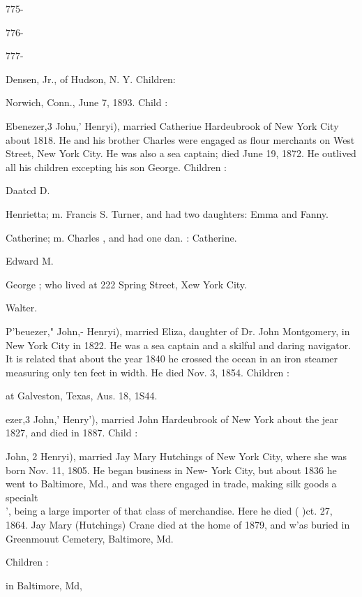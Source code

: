 \documentclass[oneside]{book}
\begin{document}
775- 




776- 




777- 









Densen, Jr., of Hudson, N. Y. Children: 




Norwich, Conn., June 7, 1893. Child : 

Ebenezer,3 Johu,' Henryi), married Catheriue Hardeubrook of 
New York City about 1818. He and his brother Charles were 
engaged as flour merchants on West Street, New York City. He 
was also a sea captain; died June 19, 1872. He outlived all his 
children excepting his son George. Children : 

Daatcd D. 

Henrietta; m. Francis S. Turner, and had two daughters: 
Emma and Fanny. 

Catherine; m. Charles , and had one dan. : Catherine. 

Edward M. 

George ; who lived at 222 Spring Street, Xew York City. 

Walter. 

P'beuezer," John,- Henryi), married Eliza, daughter of Dr. John 
Montgomery, in New York City in 1822. He was a sea captain 
and a skilful and daring navigator. It is related that about the 
year 1840 he crossed the ocean in an iron steamer measuring only 
ten feet in width. He died Nov. 3, 1854. Children : 



at Galveston, Texas, Aus. 18, 1S44. 

ezer,3 John,' Henry'), married John Hardeubrook of New York 
about the jear 1827, and died in 1887. Child : 


John, 2 Henryi), married Jay Mary Hutchings of New York City, 
where she was born Nov. 11, 1805. He began business in New- 
York City, but about 1836 he went to Baltimore, Md., and was 
there engaged in trade, making silk goods a specialt\\', being a 
large importer of that class of merchandise. Here he died ( )ct. 
27, 1864. Jay Mary (Hutchings) Crane died at the home of 
1879, and w'as buried in Greenmouut Cemetery, Baltimore, Md. 

Children : 

in Baltimore, Md, 
\end{document}
